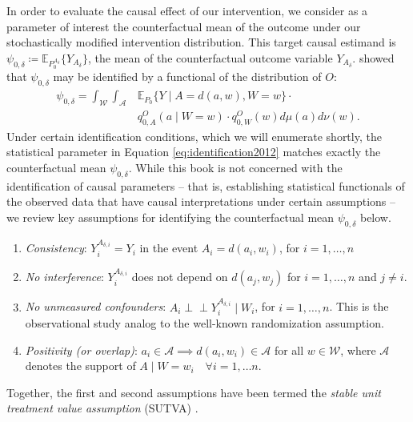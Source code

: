 \documentclass[
  12pt, krantz2,
]{krantz}
\providecommand{\tightlist}{%
  \setlength{\itemsep}{0pt}\setlength{\parskip}{0pt}}
\theoremstyle{definition}
\theoremstyle{definition}
\theoremstyle{definition}
\newcommand{\E}{\mathbb{E}}
\newcommand{\1}{\mathbbm{1}}
\newcommand{\indep}{\mbox{$\perp\!\!\!\perp$}}
\begin{document}
In order to evaluate the causal effect of our intervention, we consider as a
parameter of interest the counterfactual mean of the outcome under our
stochastically modified intervention distribution. This target causal estimand
is \(\psi_{0, \delta} \coloneqq \E_{P_0^{A_{\delta}}}\{Y_{A_{\delta}}\}\), the
mean of the counterfactual outcome variable \(Y_{A_{\delta}}\).
\citet{diaz2018stochastic} showed that \(\psi_{0, \delta}\) may be identified by a
functional of the distribution of \(O\):
\begin{align}
  \psi_{0,\delta} = \int_{\mathcal{W}} \int_{\mathcal{A}} & \E_{P_0}
   \{Y \mid A = d(a, w), W = w\} \cdot \\ &q_{0, A}^O(a \mid W = w) \cdot
   q_{0, W}^O(w) d\mu(a)d\nu(w).
  \label{eq:identification2012}
\end{align}
Under certain identification conditions, which we will enumerate shortly, the
statistical parameter in Equation \eqref{eq:identification2012} matches exactly
the counterfactual mean \(\psi_{0, \delta}\). While this book is not concerned
with the identification of causal parameters -- that is, establishing
statistical functionals of the observed data that have causal interpretations
under certain assumptions -- we review key assumptions for identifying the
counterfactual mean \(\psi_{0, \delta}\) below.

\begin{enumerate}
\def\labelenumi{\arabic{enumi}.}
\tightlist
\item
  \emph{Consistency}: \(Y^{A_{\delta,i}}_i = Y_i\) in the event \(A_i = d(a_i, w_i)\),
  for \(i = 1, \ldots, n\)
\item
  \emph{No interference}: \(Y^{A_{\delta,i}}_i\) does not depend on \(d(a_j, w_j)\) for
  \(i = 1, \ldots, n\) and \(j \neq i\).
\item
  \emph{No unmeasured confounders}: \(A_i \indep Y^{A_{\delta,i}}_i \mid W_i\), for
  \(i = 1, \ldots, n\). This is the observational study analog to the well-known
  randomization assumption.
\item
  \emph{Positivity (or overlap)}: \(a_i \in \mathcal{A} \implies d(a_i, w_i) \in \mathcal{A}\) for all \(w \in \mathcal{W}\), where \(\mathcal{A}\) denotes the
  support of \(A \mid W = w_i \quad \forall i = 1, \ldots n\).
\end{enumerate}

Together, the first and second assumptions have been termed the \emph{stable unit
treatment value assumption} (SUTVA) \citep{rubin1978bayesian, rubin1980randomization}.
\end{document}
